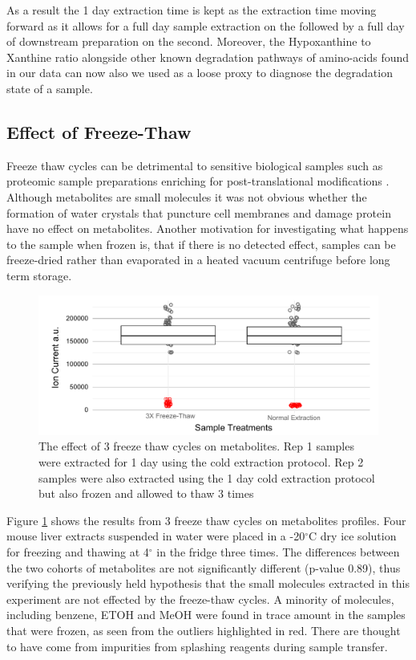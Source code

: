 \documentclass[a4paper]{book}
\begin{document}
	As a result the 1 day extraction time is kept as the extraction time moving forward as it allows for a full day sample extraction on the followed by a full day of downstream preparation on the second. Moreover, the Hypoxanthine to Xanthine ratio alongside other known degradation pathways of amino-acids \citep{Anton2015PreAnalytical} found in our data can now also we used as a loose proxy to diagnose the degradation state of a sample.
	
	\subsection*{Effect of Freeze-Thaw}
	
	Freeze thaw cycles can be detrimental to sensitive biological samples such as proteomic sample preparations enriching for post-translational modifications \citep{Paltiel2008}. Although metabolites are small molecules  it was not obvious whether the formation of water crystals that puncture cell membranes and damage protein have no effect on metabolites. Another motivation for investigating what happens to the sample when frozen is, that if there is no detected effect, samples can be freeze-dried rather than evaporated in a heated vacuum centrifuge before long term storage.
	
\begin{figure}[th]
	\centering
	\includegraphics[width=\linewidth]{2.Optimizaiton_Figures/Freeze_Thaw}
	\caption{The effect of 3 freeze thaw cycles on metabolites. Rep 1 samples were extracted for 1 day using the cold extraction protocol. Rep 2 samples were also extracted using the 1 day cold extraction protocol but also frozen and allowed to thaw 3 times}
	\label{Boxplots: Effects of Freeze Thaw Cycle}
\end{figure}
	
	Figure \ref{Boxplots: Effects of Freeze Thaw Cycle} shows the results from 3 freeze thaw cycles on metabolites profiles. Four mouse liver extracts suspended in water were placed in a -20$^\circ$C dry ice  solution for freezing and thawing at 4$^\circ$ in the fridge three times. The differences between the two cohorts of metabolites are not significantly different (p-value 0.89), thus verifying the previously held hypothesis that the small molecules extracted in this experiment are not effected by the freeze-thaw cycles. A minority of molecules, including benzene, ETOH and MeOH were found in trace amount in the samples that were frozen, as seen from the outliers highlighted in red. There are thought to have come from impurities from splashing reagents during sample transfer.
	
\end{document}
